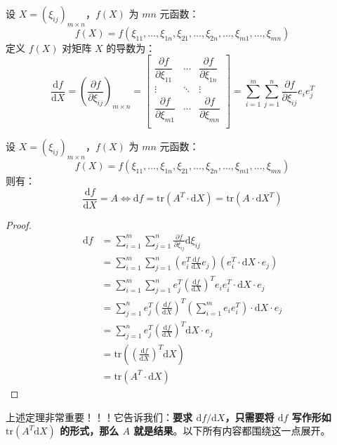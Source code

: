 \begin{definition}[函数矩阵的导数]
设 $X=(\xi_{ij})_{m\times n}$，$f(X)$ 为 $mn$ 元函数：
\[
    f(X)=f(\xi_{11},\ldots,\xi_{1n},\xi_{21},\ldots,\xi_{2n},\ldots,\xi_{m1},\ldots,\xi_{mn})
\]
定义 $f(X)$ 对矩阵 $X$ 的导数为：
\[
    \frac{\mathrm df}{\mathrm dX}=\left(\frac{\partial f}{\partial \xi_{ij}}\right)_{m\times n}=
    \begin{bmatrix}
    \dfrac{\partial f}{\partial \xi_{11}}&\cdots&\dfrac{\partial f}{\partial \xi_{1n}}\\
    \vdots&\ddots&\vdots\\
    \dfrac{\partial f}{\partial \xi_{m1}}&\cdots&\dfrac{\partial f}{\partial \xi_{mn}}\\
    \end{bmatrix}
    =\sum_{i=1}^m\sum_{j=1}^n\frac{\partial f}{\partial \xi_{ij}}e_ie_j^T
\]
\end{definition}

\begin{theorem}[函数矩阵的微分形式]
设 $X=(\xi_{ij})_{m\times n}$，$f(X)$ 为 $mn$ 元函数：
\[
    f(X)=f(\xi_{11},\ldots,\xi_{1n},\xi_{21},\ldots,\xi_{2n},\ldots,\xi_{m1},\ldots,\xi_{mn})
\]
则有：
\[
    \frac{\mathrm df}{\mathrm dX}=A\iff \mathrm df=\mathrm{tr}(A^T\cdot\mathrm dX)=\mathrm{tr}(A\cdot \mathrm dX^T)
\]
\end{theorem}
\begin{proof}
\begin{align*}
    \mathrm df&=\sum_{i=1}^m\sum_{j=1}^n\frac{\partial f}{\partial\xi_{ij}}\mathrm d\xi_{ij}\\
    &=\sum_{i=1}^m\sum_{j=1}^n\left(e_i^T\frac{\mathrm df}{\mathrm dX}e_j\right)\left(e_i^T\cdot \mathrm dX\cdot e_j\right)\\
    &=\sum_{i=1}^m\sum_{j=1}^ne_j^T\left(\frac{\mathrm df}{\mathrm dX}\right)^Te_ie_i^T\cdot\mathrm dX\cdot e_j\\
    &=\sum_{j=1}^ne_j^T\left(\frac{\mathrm df}{\mathrm dX}\right)^T\left(\sum_{i=1}^me_ie_i^T\right)\cdot\mathrm dX\cdot e_j\\
    &=\sum_{j=1}^ne_j^T\left(\frac{\mathrm df}{\mathrm dX}\right)^T\mathrm dX\cdot e_j\\
    &=\mathrm{tr}\left(\left(\frac{\mathrm df}{\mathrm dX}\right)^T\mathrm dX\right)\\
    &=\mathrm{tr}(A^T\cdot\mathrm dX)
\end{align*}
\end{proof}

\begin{remark}
上述定理非常重要！！！它告诉我们：\textbf{要求 $\mathrm df/\mathrm dX$，只需要将 $\mathrm df$ 写作形如 $\mathrm{tr}(A^T\mathrm dX)$ 的形式，那么 $A$ 就是结果}。以下所有内容都围绕这一点展开。
\end{remark}


